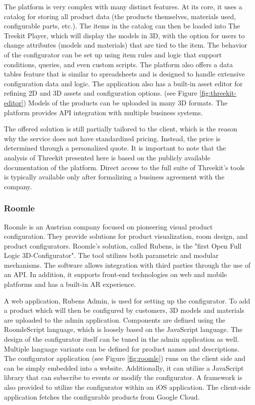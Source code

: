 The platform is very complex with many distinct features. At its core, it uses a catalog for storing all product data (the products themselves, materials used, configurable parts, etc.). The items in the catalog can then be loaded into The Treekit Player, which will display the models in 3D, with the option for users to change attributes (models and materials) that are tied to the item. The behavior of the configurator can be set up using item rules and logic that support conditions, queries, and even custom scripts. The platform also offers a data tables feature that is similar to spreadsheets and is designed to handle extensive configuration data and logic. The application also has a built-in asset editor for refining 2D and 3D assets and configuration options. (see Figure \ref{fig:threekit-editor}) Models of the products can be uploaded in many 3D formats. The platform provides API integration with multiple business systems. \cite{ThreeKitPlatformDocumentation}

The offered solution is still partially tailored to the client, which is the reason why the service does not have standardized pricing. Instead, the price is determined through a personalized quote. It is important to note that the analysis of Threekit presented here is based on the publicly available documentation of the platform. Direct access to the full suite of Threekit's tools is typically available only after formalizing a business agreement with the company.

\subsubsection{Roomle}

Roomle is an Austrian company focused on pioneering visual product configuration. They provide solutions for product visualization, room design, and product configurators. Roomle's solution, called Rubens, is the "first Open Full Logic 3D-Configurator". The tool utilizes both parametric and modular mechanisms. The software allows integration with third parties through the use of an API. In addition, it supports front-end technologies on web and mobile platforms and has a built-in AR experience. \cite{RoomleAbout}

A web application, Rubens Admin, is used for setting up the configurator. To add a product which will then be configured by customers, 3D models and materials are uploaded to the admin application. Components are defined using the RoomleScript language, which is loosely based on the JavaScript language. The design of the configurator itself can be tuned in the admin application as well. Multiple language variants can be defined for product names and descriptions. The configurator application (see Figure \ref{fig:roomle}) runs on the client side and can be simply embedded into a website. Additionally, it can utilize a JavaScript library that can subscribe to events or modify the configurator. A framework is also provided to utilize the configurator within an iOS application. The client-side application fetches the configurable products from Google Cloud. \cite{RoomleDocumentation}

